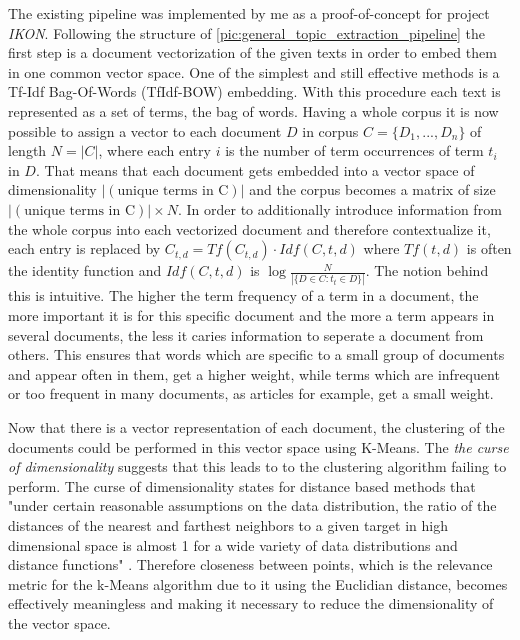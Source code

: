 The existing pipeline was implemented by me as a proof-of-concept for project \textit{IKON}. Following the structure of \autoref{pic:general_topic_extraction_pipeline} the first step is a document vectorization of the given texts in order to embed them in one common vector space. One of the simplest and still effective methods is a Tf-Idf Bag-Of-Words (TfIdf-BOW) embedding. With this procedure each text is represented as a set of terms, the bag of words. Having a whole corpus it is now possible to assign a vector to each document $D$ in corpus $C=\{D_1, ..., D_n\}$ of length $N = |C|$, where each entry $i$ is the number of term occurrences of term $t_i$ in $D$. That means that each document gets embedded into a vector space of dimensionality $|(\text{unique terms in C})|$ and the corpus becomes a matrix of size $|(\text{unique terms in C})| \times N$. In order to additionally introduce information from the whole corpus into each vectorized document and therefore contextualize it, each entry is replaced by $C_{t,d}=Tf(C_{t,d}) \cdot Idf(C,t,d)$ where $Tf(t,d)$ is often the identity function and $Idf(C,t,d)$ is $\log\frac{N}{|\{ D \in C : t_t \in D \}|}$. \cite{PivotedDocumentLength} The notion behind this is intuitive. The higher the term frequency of a term in a document, the more important it is for this specific document and the more a term appears in several documents, the less it caries information to seperate a document from others.  This ensures that words which are specific to a small group of documents and appear often in them, get a higher weight, while terms which are infrequent or too frequent in many documents, as articles for example, get a small weight.

Now that there is a vector representation of each document, the clustering of the documents could be performed in this vector space using K-Means. The \textit{the curse of dimensionality} suggests that this leads to to the clustering algorithm failing to perform. The curse of dimensionality states for distance based methods that "under certain reasonable assumptions on the
data distribution, the ratio of the distances of the nearest and farthest neighbors
to a given target in high dimensional space is almost 1 for a wide variety of data
distributions and distance functions" \cite{aggarwalSurprisingBehaviorDistance2001}. Therefore closeness between points, which is the relevance metric for the k-Means algorithm due to it using the Euclidian distance, becomes effectively meaningless and making it necessary to reduce the dimensionality of the vector space.

